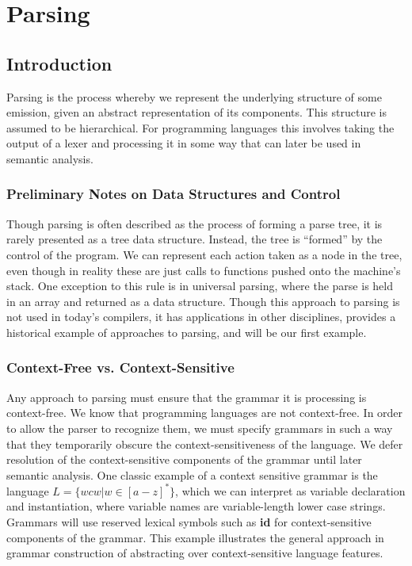 \documentclass[a4paper, 10pt]{article}
\begin{document}

\section{Parsing}
\subsection{Introduction}
Parsing is the process whereby we represent the underlying structure of some emission, given an abstract representation of its components. This structure is assumed to be hierarchical. For programming languages this involves taking the output of a lexer and processing it in some way that can later be used in semantic analysis.
\subsubsection{Preliminary Notes on Data Structures and Control}
Though parsing is often described as the process of forming a parse tree, it is rarely presented as a tree data structure. Instead, the tree is ``formed'' by the control of the program. We can represent each action taken as a node in the tree, even though in reality these are just calls to functions pushed onto the machine's stack. One exception to this rule is in universal parsing, where the parse is held in an array and returned as a data structure. Though this approach to parsing is not used in today's compilers, it has applications in other disciplines, provides a historical example of approaches to parsing, and will be our first example.
\subsubsection{Context-Free vs. Context-Sensitive}
Any approach to parsing must ensure that the grammar it is processing is context-free. We know that programming languages are not context-free. In order to allow the parser to recognize them, we must specify grammars in such a way that they temporarily obscure the context-sensitiveness of the language. We defer resolution of the context-sensitive components of the grammar until later semantic analysis. One classic example of a context sensitive grammar is the language $L=\lbrace wcw | w \in [a-z]^*\rbrace$, which we can interpret as variable declaration and instantiation, where variable names are variable-length lower case strings. Grammars will use reserved lexical symbols such as {\bf id} for context-sensitive components of the grammar. This example illustrates the general approach in grammar construction of abstracting over context-sensitive language features.
\end{document}
